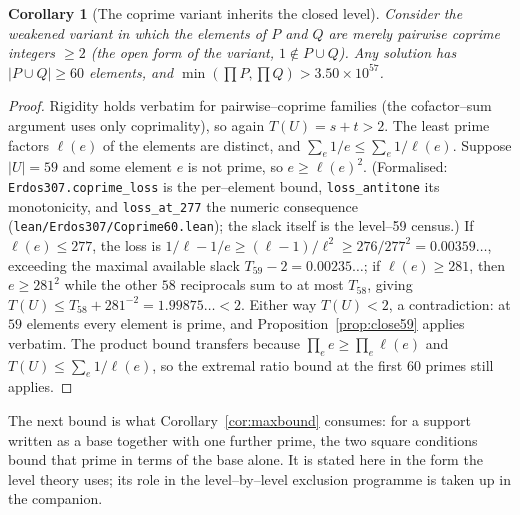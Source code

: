 \documentclass[11pt]{article}
\newtheorem{corollary}[theorem]{Corollary}
\theoremstyle{definition}
\begin{document}
\begin{corollary}[The coprime variant inherits the closed level]\label{cor:coprime60}
Consider the weakened variant in which the elements of $P$ and $Q$ are merely pairwise coprime
integers $\ge2$ \textup{(}the open form of the variant, $1\notin P\cup Q$\textup{)}. Any solution
has $|P\cup Q|\ge 60$ elements, and $\min(\prod P,\prod Q)>3.50\times10^{57}$.
\end{corollary}
\begin{proof}
Rigidity holds verbatim for pairwise--coprime families (the cofactor--sum argument uses only
coprimality), so again $T(U)=s+t>2$. The least prime factors $\ell(e)$ of the elements are distinct,
and $\sum_e 1/e\le\sum_e1/\ell(e)$. Suppose $|U|=59$ and some element $e$ is not prime, so
$e\ge\ell(e)^2$. \textup{(}Formalised: \texttt{Erdos307.coprime\_loss} is the per--element bound,
\texttt{loss\_antitone} its monotonicity, and \texttt{loss\_at\_277} the numeric consequence
\textup{(}\texttt{lean/Erdos307/Coprime60.lean}\textup{)}; the slack itself is the level--59
census.\textup{)} If $\ell(e)\le277$, the loss is
$1/\ell-1/e\ge(\ell-1)/\ell^2\ge276/277^2=0.00359\ldots$, exceeding the maximal available slack
$T_{59}-2=0.00235\ldots$; if $\ell(e)\ge281$, then $e\ge281^2$ while the other $58$ reciprocals sum
to at most $T_{58}$, giving $T(U)\le T_{58}+281^{-2}=1.99875\ldots<2$. Either way $T(U)<2$, a
contradiction: at $59$ elements every element is prime, and Proposition~\ref{prop:close59} applies
verbatim. The product bound transfers because $\prod_e e\ge\prod_e\ell(e)$ and
$T(U)\le\sum_e1/\ell(e)$, so the extremal ratio bound at the first $60$ primes still applies.
\end{proof}

The next bound is what Corollary~\ref{cor:maxbound} consumes: for a support written as a base
together with one further prime, the two square conditions bound that prime in terms of the base
alone. It is stated here in the form the level theory uses; its role in the level--by--level
exclusion programme is taken up in the companion.
\end{document}
